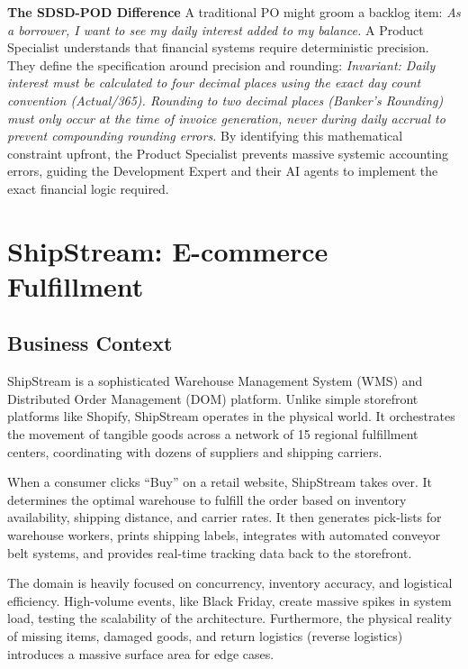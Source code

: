 \documentclass[
  11pt,
  openany,
  oneside]{book}
\renewenvironment{quote}{\begin{customquote}}{\end{customquote}}
\begin{document}
\begin{quote}
\textbf{The SDSD-POD Difference} A traditional PO might groom a backlog
item: \emph{As a borrower, I want to see my daily interest added to my
balance.} A Product Specialist understands that financial systems
require deterministic precision. They define the specification around
precision and rounding: \emph{Invariant: Daily interest must be
calculated to four decimal places using the exact day count convention
(Actual/365). Rounding to two decimal places (Banker's Rounding) must
only occur at the time of invoice generation, never during daily accrual
to prevent compounding rounding errors.} By identifying this
mathematical constraint upfront, the Product Specialist prevents massive
systemic accounting errors, guiding the Development Expert and their AI
agents to implement the exact financial logic required.
\end{quote}

\bigskip

\section{ShipStream: E-commerce
Fulfillment}\label{shipstream-e-commerce-fulfillment}

\subsection{Business Context}\label{business-context-2}

ShipStream is a sophisticated Warehouse Management System (WMS) and
Distributed Order Management (DOM) platform. Unlike simple storefront
platforms like Shopify, ShipStream operates in the physical world. It
orchestrates the movement of tangible goods across a network of 15
regional fulfillment centers, coordinating with dozens of suppliers and
shipping carriers.

When a consumer clicks ``Buy'' on a retail website, ShipStream takes
over. It determines the optimal warehouse to fulfill the order based on
inventory availability, shipping distance, and carrier rates. It then
generates pick-lists for warehouse workers, prints shipping labels,
integrates with automated conveyor belt systems, and provides real-time
tracking data back to the storefront.

The domain is heavily focused on concurrency, inventory accuracy, and
logistical efficiency. High-volume events, like Black Friday, create
massive spikes in system load, testing the scalability of the
architecture. Furthermore, the physical reality of missing items,
damaged goods, and return logistics (reverse logistics) introduces a
massive surface area for edge cases.
\end{document}
